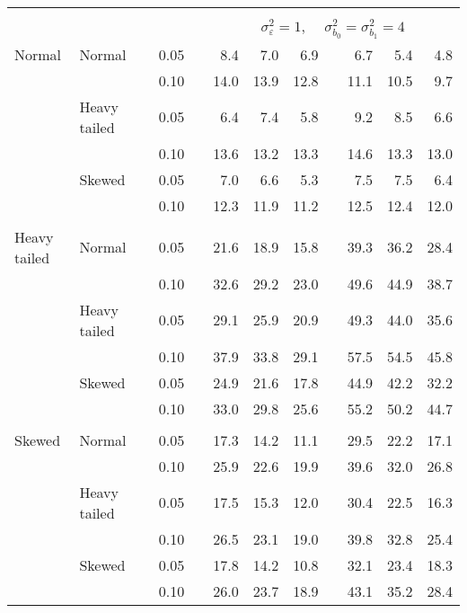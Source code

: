\begin{table}[ht]
\begin{scriptsize}
\begin{tabular}{ll p{.1cm} c p{.1cm} rrr p{.1cm} rrr}
&&&&&&&&&&&\\
& && && \multicolumn{7}{c}{$\sigma_{\varepsilon}^2 = 1$, \ \ $\sigma_{b_0}^2 = \sigma_{b_1}^2 = 4$} \\ \cline{6-12}
\rowcolor{gray!20} Normal & Normal &  & 0.05 &  & 8.4 & 7.0 & 6.9 &  & 6.7 & 5.4 & 4.8 \\ 
\rowcolor{gray!20}    &  &  & 0.10 &  & 14.0 & 13.9 & 12.8 &  & 11.1 & 10.5 & 9.7 \\ 
\rowcolor{gray!20}    & Heavy tailed &  & 0.05 &  & 6.4 & 7.4 & 5.8 &  & 9.2 & 8.5 & 6.6 \\ 
\rowcolor{gray!20}    &  &  & 0.10 &  & 13.6 & 13.2 & 13.3 &  & 14.6 & 13.3 & 13.0 \\ 
\rowcolor{gray!20}    & Skewed &  & 0.05 &  & 7.0 & 6.6 & 5.3 &  & 7.5 & 7.5 & 6.4 \\ 
\rowcolor{gray!20}    &  &  & 0.10 &  & 12.3 & 11.9 & 11.2 &  & 12.5 & 12.4 & 12.0 \\ 
&&&&&&&&&&&\\
  Heavy tailed & Normal &  & 0.05 &  & 21.6 & 18.9 & 15.8 &  & 39.3 & 36.2 & 28.4 \\ 
   &  &  & 0.10 &  & 32.6 & 29.2 & 23.0 &  & 49.6 & 44.9 & 38.7 \\ 
   & Heavy tailed &  & 0.05 &  & 29.1 & 25.9 & 20.9 &  & 49.3 & 44.0 & 35.6 \\ 
   &  &  & 0.10 &  & 37.9 & 33.8 & 29.1 &  & 57.5 & 54.5 & 45.8 \\ 
   & Skewed &  & 0.05 &  & 24.9 & 21.6 & 17.8 &  & 44.9 & 42.2 & 32.2 \\ 
   &  &  & 0.10 &  & 33.0 & 29.8 & 25.6 &  & 55.2 & 50.2 & 44.7 \\ 
&&&&&&&&&&&\\
  Skewed & Normal &  & 0.05 &  & 17.3 & 14.2 & 11.1 &  & 29.5 & 22.2 & 17.1 \\ 
   &  &  & 0.10 &  & 25.9 & 22.6 & 19.9 &  & 39.6 & 32.0 & 26.8 \\ 
   & Heavy tailed &  & 0.05 &  & 17.5 & 15.3 & 12.0 &  & 30.4 & 22.5 & 16.3 \\ 
   &  &  & 0.10 &  & 26.5 & 23.1 & 19.0 &  & 39.8 & 32.8 & 25.4 \\ 
   & Skewed &  & 0.05 &  & 17.8 & 14.2 & 10.8 &  & 32.1 & 23.4 & 18.3 \\ 
   &  &  & 0.10 &  & 26.0 & 23.7 & 18.9 &  & 43.1 & 35.2 & 28.4 \\ 


\hline
\end{tabular}
\end{scriptsize}
\end{table}




